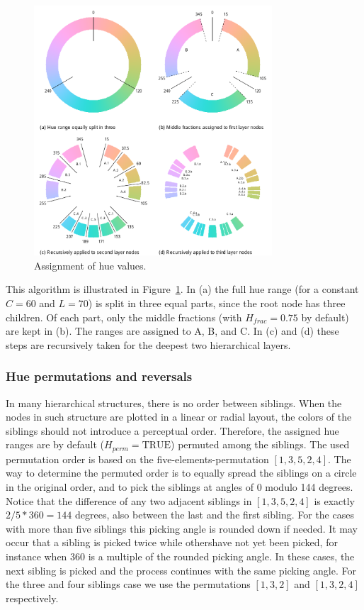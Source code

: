 \documentclass[journal]{vgtc}                %
\begin{document}
\begin{figure}[tb]
  \centering
  \includegraphics[width=3.5in]{hcl_method2.pdf}
  \caption{Assignment of hue values.}\label{fig:wheel}
\end{figure}

This algorithm is illustrated in Figure~\ref{fig:wheel}. In (a) the full hue range (for a constant $C=60$ and $L=70$)  is split in three equal parts, since the root node has three children. Of each part, only the middle fractions (with $H_{frac}=0.75$ by default) are kept in (b). The ranges are assigned to A, B, and C. In (c) and (d) these steps are recursively taken for the deepest two hierarchical layers.


\subsubsection{Hue permutations and reversals}

In many hierarchical structures, there is no order between siblings. When the nodes in such structure are plotted in a linear or radial layout, the colors of the siblings should not introduce a perceptual order. Therefore, the assigned hue ranges are by default ($H_{perm}=\mbox{TRUE}$) permuted among the siblings. The used permutation order is based on the five-elements-permutation $[1, 3, 5, 2, 4]$. The way to determine the permuted order is to equally spread the siblings on a circle in the original order, and to pick the siblings at angles of 0 modulo 144 degrees. Notice that the difference of any two adjacent siblings in $[1, 3, 5, 2, 4]$ is exactly $2/5 * 360=144$ degrees, also between the last and the first sibling. For the cases with more than five siblings this picking angle is rounded down if needed. It may occur that a sibling is picked twice while othershave not yet been picked, for instance when 360 is a multiple of the rounded picking angle. In these cases, the next sibling is picked and the process continues with the same picking angle. For the three and four siblings case we use the permutations $[1, 3, 2]$ and $[1, 3, 2, 4]$ respectively. 
\end{document}
